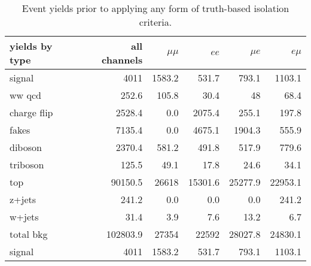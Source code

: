 \begin{table}[htp]
  \centering
  \begin{tabular}{l|rrrrr}
    yields by type&all channels&$\mu\mu$&$ee$&$\mu e$&$e\mu$\\
    \hline\hline
    signal&4011&1583.2&531.7&793.1&1103.1\\
    ww qcd&252.6&105.8&30.4&48&68.4\\
    charge flip&2528.4&0.0&2075.4&255.1&197.8\\
    fakes&7135.4&0.0&4675.1&1904.3&555.9\\
    diboson&2370.4&581.2&491.8&517.9&779.6\\
    triboson&125.5&49.1&17.8&24.6&34.1\\
    top&90150.5&26618&15301.6&25277.9&22953.1\\
    z+jets&241.2&0.0&0.0&0.0&241.2\\
    w+jets&31.4&3.9&7.6&13.2&6.7\\
    \hline
    total bkg&102803.9&27354&22592&28027.8&24830.1\\
    signal&4011&1583.2&531.7&793.1&1103.1\\
    \hline
  \end{tabular}
  \caption{Event yields prior to applying any form of truth-based isolation criteria.}
  \label{tab:truth_iso_noiso}
\end{table}

